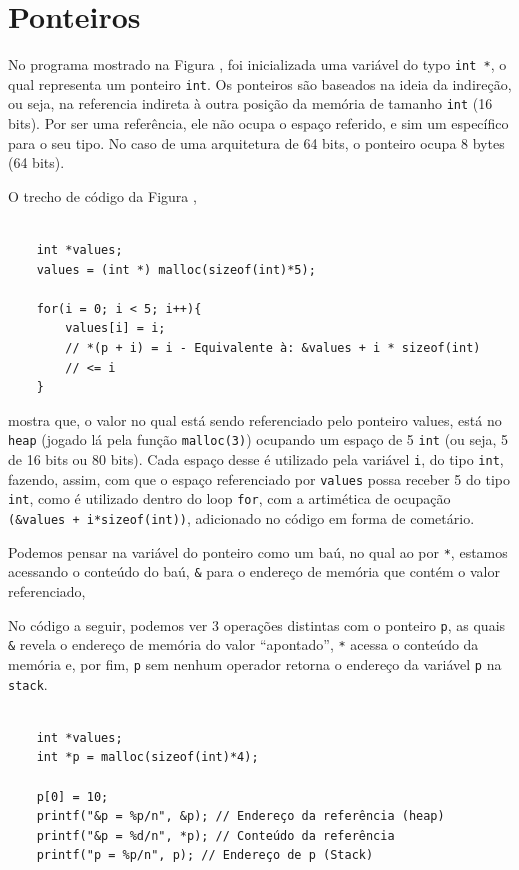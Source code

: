 \hypertarget{ponteiros}{%
\section{Ponteiros}\label{ponteiros}}

No programa mostrado na Figura \label{fig:Alocação de memória de um programa em C}, foi inicializada uma variável do typo
\texttt{int\ *}, o qual representa um ponteiro \texttt{int}. Os
ponteiros são baseados na ideia da indireção, ou seja, na referencia
indireta à outra posição da memória de tamanho \texttt{int} (16 bits).
Por ser uma referência, ele não ocupa o espaço referido, e sim um
específico para o seu tipo. No caso de uma arquitetura de 64 bits, o
ponteiro ocupa 8 bytes (64 bits).

O trecho de código da Figura \label{fig:Alocação de memória de um programa em C},


\begin{verbatim}

    int *values;
    values = (int *) malloc(sizeof(int)*5);
    
    for(i = 0; i < 5; i++){
        values[i] = i; 
        // *(p + i) = i - Equivalente à: &values + i * sizeof(int) 
        // <= i
    }

\end{verbatim}


mostra que, o valor no qual está sendo referenciado pelo ponteiro
values, está no \texttt{heap} (jogado lá pela função \texttt{malloc(3)})
ocupando um espaço de 5 \texttt{int} (ou seja, 5 de 16 bits ou 80 bits).
Cada espaço desse é utilizado pela variável \texttt{i}, do tipo
\texttt{int}, fazendo, assim, com que o espaço referenciado por
\texttt{values} possa receber 5 do tipo \texttt{int}, como é utilizado
dentro do loop \texttt{for}, com a artimética de ocupação
\texttt{(\&values\ +\ i*sizeof(int))}, adicionado no código em forma de
cometário.

Podemos pensar na variável do ponteiro como um baú, no qual ao por
\texttt{*}, estamos acessando o conteúdo do baú, \texttt{\&} para o
endereço de memória que contém o valor referenciado,

No código a seguir, podemos ver 3 operações distintas com o ponteiro
\texttt{p}, as quais \texttt{\&} revela o endereço de memória do valor
``apontado'', \texttt{*} acessa o conteúdo da memória e, por fim,
\texttt{p} sem nenhum operador retorna o endereço da variável \texttt{p}
na \texttt{stack}.


\begin{verbatim}

    int *values;
    int *p = malloc(sizeof(int)*4);
    
    p[0] = 10;
    printf("&p = %p/n", &p); // Endereço da referência (heap)
    printf("&p = %d/n", *p); // Conteúdo da referência
    printf("p = %p/n", p); // Endereço de p (Stack)

\end{verbatim}

